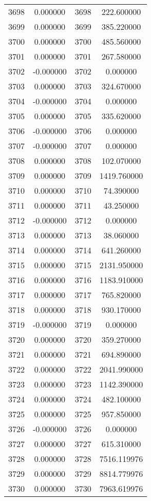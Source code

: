 \documentclass[12pt]{article}
\begin{document}
\begin{longtable}{@{}cccc@{}}
3698 & 0.000000 & 3698 & 222.600000 \\
3699 & 0.000000 & 3699 & 385.220000 \\
3700 & 0.000000 & 3700 & 485.560000 \\
3701 & 0.000000 & 3701 & 267.580000 \\
3702 & -0.000000 & 3702 & 0.000000 \\
3703 & 0.000000 & 3703 & 324.670000 \\
3704 & -0.000000 & 3704 & 0.000000 \\
3705 & 0.000000 & 3705 & 335.620000 \\
3706 & -0.000000 & 3706 & 0.000000 \\
3707 & -0.000000 & 3707 & 0.000000 \\
3708 & 0.000000 & 3708 & 102.070000 \\
3709 & 0.000000 & 3709 & 1419.760000 \\
3710 & 0.000000 & 3710 & 74.390000 \\
3711 & 0.000000 & 3711 & 43.250000 \\
3712 & -0.000000 & 3712 & 0.000000 \\
3713 & 0.000000 & 3713 & 38.060000 \\
3714 & 0.000000 & 3714 & 641.260000 \\
3715 & 0.000000 & 3715 & 2131.950000 \\
3716 & 0.000000 & 3716 & 1183.910000 \\
3717 & 0.000000 & 3717 & 765.820000 \\
3718 & 0.000000 & 3718 & 930.170000 \\
3719 & -0.000000 & 3719 & 0.000000 \\
3720 & 0.000000 & 3720 & 359.270000 \\
3721 & 0.000000 & 3721 & 694.890000 \\
3722 & 0.000000 & 3722 & 2041.990000 \\
3723 & 0.000000 & 3723 & 1142.390000 \\
3724 & 0.000000 & 3724 & 482.100000 \\
3725 & 0.000000 & 3725 & 957.850000 \\
3726 & -0.000000 & 3726 & 0.000000 \\
3727 & 0.000000 & 3727 & 615.310000 \\
3728 & 0.000000 & 3728 & 7516.119976 \\
3729 & 0.000000 & 3729 & 8814.779976 \\
3730 & 0.000000 & 3730 & 7963.619976 \\

\end{longtable}
\end{document}
